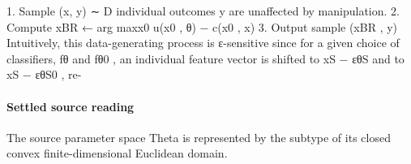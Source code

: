 \documentclass[10pt]{article}
\begin{document}
\begin{ReviewVerbatim}
   1. Sample (x, y) ∼ D                                                         individual outcomes y are unaffected by manipulation.
   2. Compute xBR ← arg maxx0 u(x0 , θ) − c(x0 , x)
   3. Output sample (xBR , y)                                                   Intuitively, this data-generating process is ε-sensitive since
                                                                                for a given choice of classiﬁers, fθ and fθ0 , an individual
                                                                                feature vector is shifted to xS − εθS and to xS − εθS0 , re-
\end{ReviewVerbatim}

\paragraph{Settled source reading}
\begin{sloppypar}
The source parameter space Theta is represented by the subtype of its closed convex finite-\allowbreak{}dimensional Euclidean domain.\allowbreak{}
\end{sloppypar}
\end{document}
